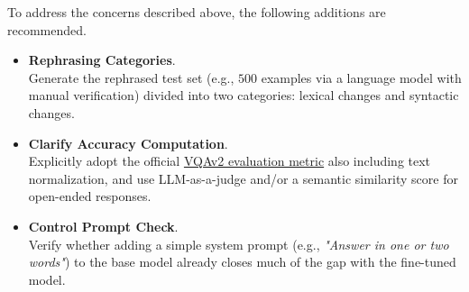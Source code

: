 To address the concerns described above, the following additions are recommended.
\begin{itemize}
    \renewcommand{\labelitemi}{-}
    \item \textbf{Rephrasing Categories}. \\ 
    Generate the rephrased test set (e.g., $500$ examples via a language model 
    with manual verification) divided into two categories: lexical changes and syntactic changes.
    \item \textbf{Clarify Accuracy Computation}. \\
    Explicitly adopt the official \href{https://visualqa.org/evaluation.html}{VQAv2 evaluation metric}
    also including text normalization, and use LLM-as-a-judge and/or a semantic similarity
    score for open-ended responses.
    \item \textbf{Control Prompt Check}. \\
    Verify whether adding a simple system prompt (e.g., \textit{"Answer in one or two words"}) 
    to the base model already closes much of the gap with the fine-tuned model.
\end{itemize}